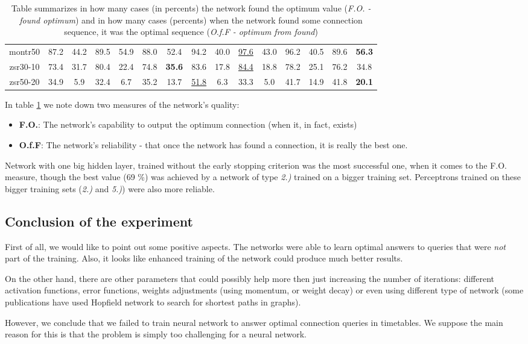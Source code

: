 \begin{table}[h]
\begin{tabular}{c|c|c|c|c|c|c|c|c|c|c|c|c|c|c}
				montr50 & 87.2 & 44.2 & 89.5 & 54.9 & 88.0 & 52.4 & 94.2 & 40.0 & \underline{97.6} & 43.0 & 96.2 & 40.5 & 89.6 & \textbf{56.3} \\
				zsr30-10 & 73.4 & 31.7 & 80.4 & 22.4 & 74.8 & \textbf{35.6} & 83.6 & 17.8 & \underline{84.4} & 18.8 & 78.2 & 25.1 & 76.2 & 34.8 \\
				zsr50-20 & 34.9 & 5.9 & 32.4 & 6.7 & 35.2 & 13.7 & \underline{51.8} & 6.3 & 33.3 & 5.0 & 41.7 & 14.9 & 41.8 & \textbf{20.1} \\
        \end{tabular}
        \caption{\label{tab:resultsperc} Table summarizes in how many cases (in percents) the network found the optimum value (\textit{F.O. - found optimum}) and in how many cases (percents) when the network found some connection sequence, it was the optimal sequence (\textit{O.f.F - optimum from found})}
        \normalsize
    \end{table}
    
    \noindent In table \ref{tab:resultsperc} we note down two measures of the network's quality:
    \begin{itemize}
    	\item \textbf{F.O.}: The network's capability to output the optimum connection (when it, in fact, exists)
    	\item \textbf{O.f.F}: The network's reliability - that once the network has found a connection, it is really the best one.
    \end{itemize}
    \hspace{\fill}
    
    \noindent Network with one big hidden layer, trained without the early stopping criterion was the most successful one, when it comes to the F.O. measure, though the best value (69 \%) was achieved by a network of type \textit{2.)} trained on a bigger training set. Perceptrons trained on these bigger training sets (\textit{2.)} and \textit{5.)}) were also more reliable.
	
\subsection{Conclusion of the experiment}
	
	First of all, we would like to point out some positive aspects. The networks were able to learn optimal answers to queries that were \textit{not} part of the training. Also, it looks like enhanced training of the network could produce much better results.
	
	On the other hand, there are other parameters that could possibly help more then just increasing the number of iterations: different activation functions, error functions, weights adjustments (using momentum, or weight decay) or even using different type of network (some publications have used Hopfield network to search for shortest paths in graphs). 
	
	However, we conclude that we failed to train neural network to answer optimal connection queries in timetables. We suppose the main reason for this is that the problem is simply too challenging for a neural network.